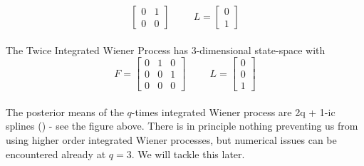 {$$\begin{bmatrix}
        0 & 1 \\ 0 & 0
    \end{bmatrix} \hspace{1cm} L=\begin{bmatrix}
        0 \\ 
        1 
    \end{bmatrix}$$
    \\ The Twice Integrated Wiener Process has 3-dimensional state-space with $$F=\begin{bmatrix}
        0 & 1 & 0 \\ 0 & 0 & 1 \\ 0 & 0 & 0
    \end{bmatrix} \hspace{1cm} L=\begin{bmatrix}
        0 \\ 0 \\ 1
    \end{bmatrix}$$
    \\ The posterior means of the $q$-times integrated Wiener process are 2q + 1-ic splines (\cite{probnum}) - see the figure above. There is in principle nothing preventing us from using higher order integrated Wiener processes, but numerical issues can be encountered already at $q=3$. We will tackle this later.
}
